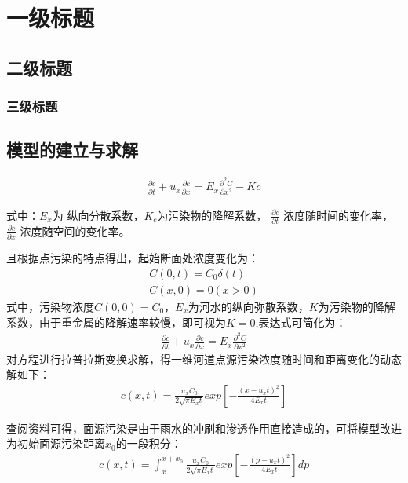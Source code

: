 \documentclass{whutmod}
\begin{document}
	
	\section{一级标题}
	\subsection{二级标题}
	\subsubsection{三级标题}
	\pageref{段落}

	\subsection{模型的建立与求解}

	
		\begin{gather}
\frac{\partial c}{\partial t}+u_{x}\frac{\partial c}{\partial x}=E_{x}\frac{\partial^{2} C}{\partial x^{2}}-Kc
\end{gather}

	式中：$E_{x}$为 纵向分散系数，$K_{c}$为污染物的降解系数，
	$\frac{\partial c}{\partial t}$ 浓度随时间的变化率，$\frac{\partial c}{\partial x}$ 浓度随空间的变化率。
	
	且根据点污染的特点得出，起始断面处浓度变化为：
	\begin{gather*}
	C(0,t)=C_{0}\delta (t)\\
	 C(x,0)=0(x>0)
	\end{gather*}
	式中，污染物浓度$C(0,0)=C_{0}$，$E_{x}$为河水的纵向弥散系数，$K$为污染物的降解系数，由于重金属的降解速率较慢，即可视为$K=0$,表达式可简化为：
		\begin{gather*}
	 \frac{\partial c}{\partial t}+u_{x}\frac{\partial c}{\partial x}=E_{x}\frac{\partial^{2} C}{\partial x^{2}}
	\end{gather*}
	对方程进行拉普拉斯变换求解\parencite{张永祥2018龙江河镉污染分布及迁移研究}，得一维河道点源污染浓度随时间和距离变化的动态解如下：
			\begin{gather}
	c(x,t)=\frac{u_{x}C_{0}}{2\sqrt{\pi E_{x}t}}exp[-\frac{(x-u_{x}t)^{2}}{4E_{x}t}]
	\end{gather}
	
	查阅资料可得\parencite{geng2019novel}，面源污染是由于雨水的冲刷和渗透作用直接造成的，可将模型改进为初始面源污染距离$x_{0}$的一段积分\parencite{xie2019intra}：
			\begin{gather}
c(x,t)=\int_{x}^{x+x_{0}}\frac{u_{x}C_{0}}{2\sqrt{\pi E_{x}t}}exp[-\frac{(p-u_{x}t)^{2}}{4E_{x}t}]dp
	\end{gather}
	
\end{document}
